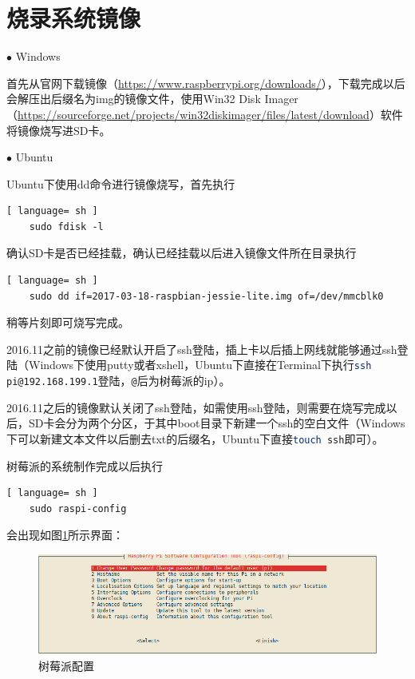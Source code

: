 	\section{烧录系统镜像}
		\par\noindent $\bullet$ Windows
		\par 首先从官网下载镜像（\href{https://www.raspberrypi.org/downloads/}{https://www.raspberrypi.org/downloads/}），下载完成以后会解压出后缀名为img的镜像文件，使用Win32 Disk Imager（\href{https://sourceforge.net/projects/win32diskimager/files/latest/download}{https://sourceforge.net/projects/win32diskimager/files/latest/download}）软件将镜像烧写进SD卡。
		\par\noindent $\bullet$ Ubuntu
		\par Ubuntu下使用dd命令进行镜像烧写，首先执行
		\begin{lstlisting}[ language= sh ]
	sudo fdisk -l
		\end{lstlisting}
		\par 确认SD卡是否已经挂载，确认已经挂载以后进入镜像文件所在目录执行
		\begin{lstlisting}[ language= sh ]
	sudo dd if=2017-03-18-raspbian-jessie-lite.img of=/dev/mmcblk0
		\end{lstlisting}
		\par 稍等片刻即可烧写完成。
		\par 2016.11之前的镜像已经默认开启了ssh登陆，插上卡以后插上网线就能够通过ssh登陆（Windows下使用putty或者xshell，Ubuntu下直接在Terminal下执行\lstinline[language=sh]{ssh pi@192.168.199.1}登陆，\lstinline[language=sh]{@}后为树莓派的ip）。
		\par 2016.11之后的镜像默认关闭了ssh登陆，如需使用ssh登陆，则需要在烧写完成以后，SD卡会分为两个分区，于其中boot目录下新建一个ssh的空白文件（Windows下可以新建文本文件以后删去txt的后缀名，Ubuntu下直接\lstinline[language=sh]{touch ssh}即可）。
		\par 树莓派的系统制作完成以后执行
		\begin{lstlisting}[ language= sh ]
	sudo raspi-config
		\end{lstlisting}
		\par 会出现如图\ref{fig:raspi_config}所示界面：
		\begin{figure}[htp]
			\centering
			\includegraphics[width=13cm]{figures/raspi-config.png}
			\caption{树莓派配置}
			\label{fig:raspi_config}
		\end{figure}
